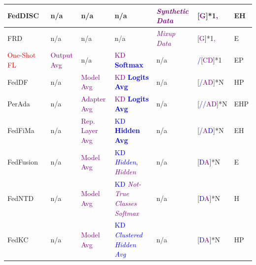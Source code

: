 \begin{table}[htp]
\begin{longtable}{|p{1.68cm}|p{1.2cm}|p{1.25cm}|p{5.0cm}|p{2.59cm}|p{1.2cm}|p{0.35cm}|}
    \rowcolor[gray]{.9}
    FedDISC~\cite{yang2023exploring} & n/a & n/a & n/a & \textcolor{purple}{\textit{Synthetic Data}} &[\textcolor{purple}{G}]*1\textcolor{purple}{,} & EH \\ \hline

    FRD~\cite{cha2019federated} & n/a & n/a & n/a & \textcolor{purple}{\textit{Mixup Data}} &[\textcolor{purple}{G}]*1\textcolor{purple}{,} & E \\ \hline

    \rowcolor[gray]{.9}
    \textcolor{red}{One-Shot FL}~\cite{guha2018one} & \textcolor{purple}{Output Avg} & n/a & \textcolor{purple}{KD} \textcolor{blue}{\textbf{Softmax}} & n/a & \textcolor{blue}{/}[\textcolor{purple}{CD}]*1 & EP \\ \hline %

    FedDF~\cite{lin2020ensemble} & n/a & \textcolor{purple}{Model Avg} & \textcolor{purple}{KD}  \textcolor{blue}{\textbf{Logits Avg}} & n/a & [\textcolor{blue}{/}\textcolor{purple}{AD}]*N & HP \\ \hline %

    \rowcolor[gray]{.9}
    PerAda~\cite{xie2023perada} & n/a & \textcolor{purple}{Adapter Avg} & \textcolor{purple}{KD} \textcolor{blue}{\textbf{Logits Avg}} & n/a & [\textcolor{blue}{//}\textcolor{purple}{AD}]*N & EHP \\ \hline

    FedFiMa~\cite{che2022federated} & n/a & \textcolor{purple}{Rep. Layer Avg} & \textcolor{blue}{KD} \textcolor{blue}{\textbf{Hidden Avg}} & n/a & [\textcolor{blue}{/}\textcolor{purple}{A}\textcolor{blue}{D}]*N & EH \\ \hline

    \rowcolor[gray]{.9}
    FedFusion~\cite{yao2019towards} & n/a & \textcolor{purple}{Model Avg} & \textcolor{blue}{KD} \textcolor{blue}{\textit{Hidden}}, \textcolor{purple}{\textit{Hidden}} & n/a & [\textcolor{blue}{D}\textcolor{purple}{A}]*N & E \\ \hline %

    FedNTD~\cite{lee2022preservation} & n/a & \textcolor{purple}{Model Avg} & \textcolor{blue}{KD} \textcolor{purple}{\textit{Not-True Classes Softmax}} & n/a & [\textcolor{blue}{D}\textcolor{purple}{A}]*N & H \\ \hline %

    \rowcolor[gray]{.9}
    FedKC~\cite{wang2022fedkc} & n/a & \textcolor{purple}{Model Avg} & \textcolor{blue}{KD} \textcolor{blue}{\textit{Clustered Hidden Avg}} & n/a & [\textcolor{blue}{D}\textcolor{purple}{A}]*N & HP \\ \hline %


\end{longtable}
\end{table}
